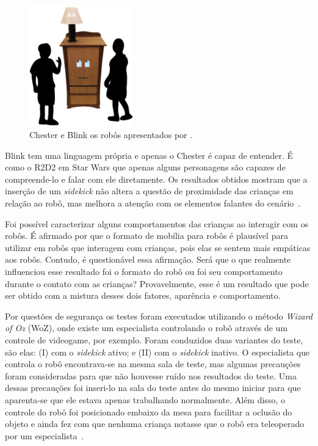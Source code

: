\begin{figure}[ht!]
	\centering
	\includegraphics[width=0.4\textwidth]{images/vazquez2014.png}
	\caption{Chester e Blink os robôs apresentados por .}
	\label{fig:vazquez}
\end{figure}

Blink tem uma linguagem própria e apenas o Chester é capaz de entender. É como o R2D2 em Star Wars que apenas alguns personagens são capazes de compreende-lo e falar com ele diretamente. Os resultados obtidos mostram que a inserção de um \emph{sidekick} não altera a questão de proximidade das crianças em relação ao robô, mas melhora a atenção com os elementos falantes do cenário~\cite{Vazquez:2014}.

Foi possível caracterizar alguns comportamentos das crianças ao interagir com os robôs. É afirmado por  que o formato de mobília para robôs é plausível para utilizar em robôs que interagem com crianças, pois elas se sentem mais empáticas aos robôs. Contudo, é questionável essa afirmação. Será que o que realmente influenciou esse resultado foi o formato do robô ou foi seu comportamento durante o contato com as crianças? Provavelmente, esse é um resultado que pode ser obtido com a mistura desses dois fatores, aparência e comportamento.

Por questões de segurança os testes foram executados utilizando o método \emph{Wizard of Oz} (WoZ), onde existe um especialista controlando o robô através de um controle de videogame, por exemplo. Foram conduzidos duas variantes do teste, são elas: (I) com o \emph{sidekick} ativo; e (II) com o \emph{sidekick} inativo. O especialista que controla o robô encontrava-se na mesma sala de teste, mas algumas precauções foram consideradas para que não houvesse ruído nos resultados do teste. Uma dessas precauções foi inseri-lo na sala do teste antes do mesmo iniciar para que aparenta-se que ele estava apenas trabalhando normalmente. Além disso, o controle do robô foi posicionado embaixo da mesa para facilitar a oclusão do objeto e ainda fez com que nenhuma criança notasse que o robô era teleoperado por um especialista~\cite{Vazquez:2014}.

